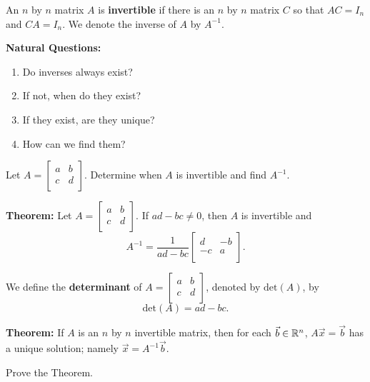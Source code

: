 \newpage

\begin{defn}
An $n$ by $n$ matrix $A$ is {\bf invertible} if there is an $n$ by $n$ matrix $C$ so that $AC=I_n$ and $CA=I_n$. We denote the inverse of $A$ by $A^{-1}$.
\end{defn}

{\bf Natural Questions:}
\begin{enumerate}
\item Do inverses always exist?
\item If not, when do they exist?
\item If they exist, are they unique?
\item How can we find them?
\end{enumerate}

\begin{enumerate}

\Problem Let $A=\begin{bmatrix} a & b\\ c & d\\ \end{bmatrix}$. Determine when $A$ is invertible and find $A^{-1}$. 

\newpage

{\bf Theorem:} Let $A=\begin{bmatrix} a & b \\ c & d\\ \end{bmatrix}$. If $ad-bc\neq 0$, then $A$ is invertible  and $$A^{-1}= \frac{1}{ad-bc} \begin{bmatrix} d & -b\\ -c &a \\ \end{bmatrix}.$$

\begin{defn}
We define the {\bf determinant} of $A=\begin{bmatrix} a & b \\ c & d\\ \end{bmatrix}$, denoted by $\text{det}(A)$, by $$\text{det}(A)=ad-bc.$$
\end{defn}

{\bf Theorem:} If $A$ is an $n$ by $n$ invertible matrix, then for each $\vec{b}\in \mathbb{R}^n$, $A\vec{x}=\vec{b}$ has a unique solution; namely $\vec{x}=A^{-1}\vec{b}$.

\Problem Prove the Theorem.

\vfill


\end{enumerate}
